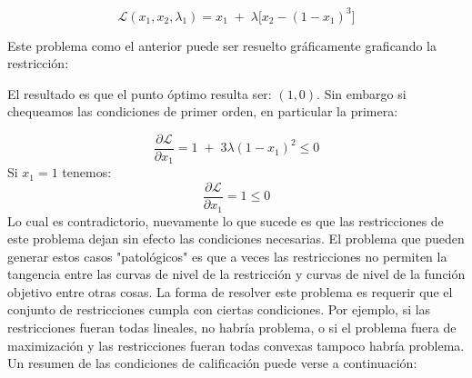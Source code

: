 \documentclass{article}
\begin{document}
\[
\mathcal{L}(x_1,x_2,\lambda_1)
= x_1 \;+\; \lambda\big[x_2-(1-x_1)^3\big]
\]

Este problema como el anterior puede ser resuelto gráficamente graficando la restricción:



\begin{center}
\end{center}

El resultado es que el punto óptimo resulta ser: $(1,0)$. Sin embargo si chequeamos las condiciones de primer orden, en particular la primera:


\begin{equation*}
\dfrac{\partial \mathcal L}{\partial x_1}
= 1 \;+\; 3\lambda(1-x_1)^2  \leq 0
\end{equation*}
Si $x_1=1$ tenemos:
\begin{equation*}
\dfrac{\partial \mathcal L}{\partial x_1}
= 1\leq 0
\end{equation*}
Lo cual es contradictorio, nuevamente lo que sucede es que las restricciones de este problema dejan sin efecto las condiciones necesarias. El problema que pueden generar estos casos "patológicos" es que a veces las restricciones no permiten la tangencia entre las curvas de nivel de la restricción y curvas de nivel de la función objetivo entre otras cosas. La forma de resolver este problema es requerir que el conjunto de restricciones cumpla con ciertas condiciones. Por ejemplo, si las restricciones fueran todas lineales, no habría problema, o si el problema fuera de maximización y las restricciones fueran todas convexas tampoco habría problema. Un resumen de las condiciones de calificación puede verse a continuación:
\end{document}
